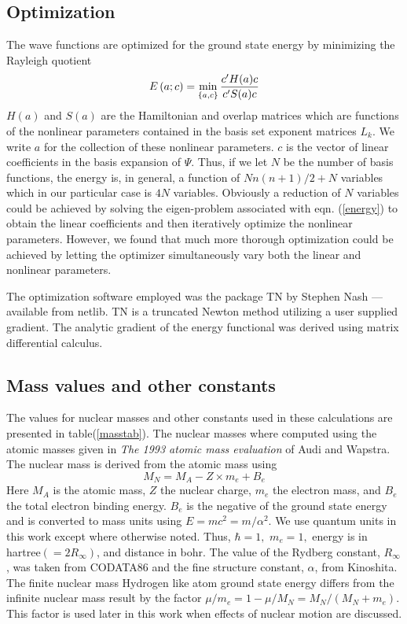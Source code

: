 \documentclass[12pt,thmsa]{article}
\begin{document}
\subsection{Optimization}

The wave functions are optimized for the ground state energy by minimizing
the Rayleigh quotient 
\begin{equation}
E\left( a;c\right) =\min_{\left\{ a,c\right\} }\frac{c^{\prime }H(a)c}{%
c^{\prime }S(a)c}  \label{energy}
\end{equation}
$H\left( a\right) $ and $S\left( a\right) $ are the Hamiltonian and overlap
matrices which are functions of the nonlinear parameters contained in the
basis set exponent matrices $L_k$. We write $a$ for the collection of these
nonlinear parameters. $c$ is the vector of linear coefficients in the basis
expansion of $\Psi .$ Thus, if we let $N$ be the number of basis functions,
the energy is, in general, a function of $Nn\left( n+1\right) /2+N$
variables which in our particular case is $4N$ variables. Obviously a
reduction of $N$ variables could be achieved by solving the eigen-problem
associated with eqn. (\ref{energy}) to obtain the linear coefficients and
then iteratively optimize the nonlinear parameters. However, we found that
much more thorough optimization could be achieved by letting the optimizer
simultaneously vary both the linear and nonlinear parameters.

The optimization software employed was the package TN by Stephen Nash\cite
{NashTN} --- available from netlib\cite{netlib}. TN is a truncated Newton
method utilizing a user supplied gradient. The analytic gradient of the
energy functional was derived using matrix differential calculus\cite
{Kinghorn95a,Kinghorn95b}.

\subsection{Mass values and other constants}

The values for nuclear masses and other constants used in these calculations
are presented in table(\ref{masstab}). The nuclear masses where computed
using the atomic masses given in \emph{The 1993 atomic mass evaluation} of
Audi and Wapstra\cite{Audi93}. The nuclear mass is derived from the atomic
mass using 
\begin{equation}
M_N=M_A-Z\times m_e+B_e
\end{equation}
Here $M_A$ is the atomic mass, $Z$ the nuclear charge, $m_e$ the electron
mass, and $B_e$ the total electron binding energy. $B_e$ is the negative of
the ground state energy and is converted to mass units using $%
E=mc^2=m/\alpha ^2.$ We use quantum units in this work except where
otherwise noted. Thus, $\hbar =1,$ $m_e=1,$ energy is in hartree$\left(
=2R_\infty \right) $, and distance in bohr. The value of the Rydberg
constant, $R_\infty $, was taken from CODATA86\cite{codata86} and the fine
structure constant, $\alpha $, from Kinoshita\cite{Kinoshita95}. The finite
nuclear mass Hydrogen like atom ground state energy differs from the
infinite nuclear mass result by the factor $\mu /m_e=1-\mu /M_N=M_N/\left(
M_N+m_e\right) .$ This factor is used later in this work when effects of
nuclear motion are discussed.
\end{document}
